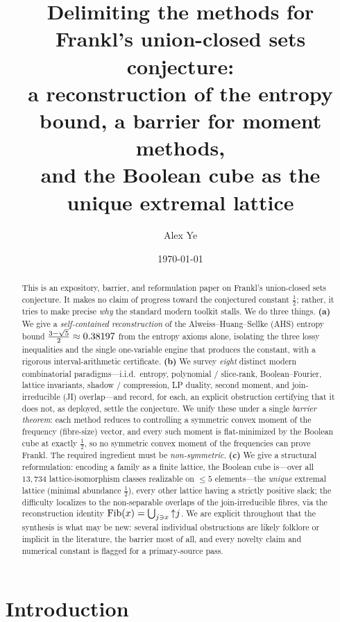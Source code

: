 \documentclass[11pt]{amsart}
\title[Delimiting the methods for the union-closed sets conjecture]{Delimiting
the methods for Frankl's union-closed sets conjecture:\\ a reconstruction of the
entropy bound, a barrier for moment methods,\\ and the Boolean cube as the unique
extremal lattice}
\author[A. Ye]{Alex Ye}
\date{\today}
\theoremstyle{definition}
\theoremstyle{remark}
\begin{document}
\begin{abstract}
This is an expository, barrier, and reformulation paper on Frankl's union-closed
sets conjecture. It makes no claim of progress toward the conjectured constant
$\tfrac12$; rather, it tries to make precise \emph{why} the standard modern
toolkit stalls. We do three things. \textbf{(a)} We give a \emph{self-contained
reconstruction} of the Alweiss--Huang--Sellke (AHS) entropy bound
$\tfrac{3-\sqrt{5}}{2}\approx 0.38197$ from the entropy axioms alone, isolating the three lossy
inequalities and the single one-variable engine that produces the constant, with
a rigorous interval-arithmetic certificate. \textbf{(b)} We survey
\emph{eight} distinct modern combinatorial paradigms---i.i.d.\ entropy,
polynomial / slice-rank, Boolean--Fourier, lattice invariants, shadow /
compression, LP duality, second moment, and join-irreducible (JI) overlap---and
record, for each, an explicit obstruction certifying that it does not, as
deployed, settle the conjecture. We unify these under a single
\emph{barrier theorem}: each method reduces to controlling a symmetric convex
moment of the frequency (fibre-size) vector, and every such moment is
flat-minimized by the Boolean cube at exactly $\tfrac12$, so no symmetric convex
moment of the frequencies can prove Frankl. The required ingredient must be
\emph{non-symmetric}. \textbf{(c)} We give a structural reformulation: encoding a
family as a finite lattice, the Boolean cube is---over all
$13{,}734$ lattice-isomorphism classes realizable on $\le 5$ elements---the
\emph{unique} extremal lattice (minimal abundance $\tfrac12$), every other lattice
having a strictly positive slack; the difficulty localizes to the non-separable
overlaps of the join-irreducible fibres, via the reconstruction identity
$\mathrm{Fib}(x)=\bigcup_{j\ni x}{\uparrow}j$. We are explicit throughout that the synthesis
is what may be new: several individual obstructions are likely folklore or
implicit in the literature, the barrier most of all, and every novelty claim and
numerical constant is flagged for a primary-source pass.
\end{abstract}

\maketitle

\section{Introduction}
\label{sec:intro}
\end{document}
